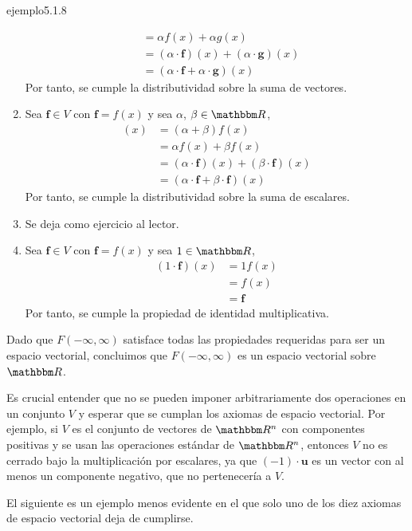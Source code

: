\begin{examplebox}{}{ejemplo5.1.8}
\begin{enumerate}[label=\roman*), topsep=6pt, itemsep=0pt]
\begin{align*}
            & = \alpha f(x) + \alpha g(x) \\
            & = (\alpha \cdot \mathbf{f})(x) + (\alpha \cdot \mathbf{g})(x) \\
            & = (\alpha \cdot \mathbf{f} + \alpha \cdot \mathbf{g})(x)
        \end{align*}
        Por tanto, se cumple la distributividad sobre la suma de vectores.
        \item Sea $\mathbf{f} \in V$ con $\mathbf{f} = f(x)$ y sea $\alpha$, $\beta \in \RR$,
        \begin{align*}
            [(\alpha + \beta) \cdot \mathbf{f}](x) & = (\alpha + \beta) f(x) \\
            & = \alpha f(x) + \beta f(x) \\
            & = (\alpha \cdot \mathbf{f})(x) + (\beta \cdot \mathbf{f})(x) \\
            & = (\alpha \cdot \mathbf{f} + \beta \cdot \mathbf{f})(x)
        \end{align*}
        Por tanto, se cumple la distributividad sobre la suma de escalares.
        \item Se deja como ejercicio al lector.
        \item Sea $\mathbf{f} \in V$ con $\mathbf{f} = f(x)$ y sea $1 \in \RR$,
        \begin{align*}
            (1 \cdot \mathbf{f})(x) & = 1 f(x) \\
            & = f(x) \\
            & = \mathbf{f}
        \end{align*}
        Por tanto, se cumple la propiedad de identidad multiplicativa.
    \end{enumerate}
    Dado que $F(-\infty, \infty)$ satisface todas las propiedades requeridas para ser un espacio vectorial, concluimos que $F(-\infty, \infty)$ es un espacio vectorial sobre $\RR$.
\end{examplebox}

Es crucial entender que no se pueden imponer arbitrariamente dos operaciones en un conjunto $V$ y esperar que se cumplan los axiomas de espacio vectorial. Por ejemplo, si $V$ es el conjunto de vectores de $\RR[n]$ con componentes positivas y se usan las operaciones estándar de $\RR[n]$, entonces $V$ no es cerrado bajo la multiplicación por escalares, ya que $(-1) \cdot \mathbf{u}$ es un vector con al menos un componente negativo, que no pertenecería a $V$.

El siguiente es un ejemplo menos evidente en el que solo uno de los diez axiomas de espacio vectorial deja de cumplirse.

